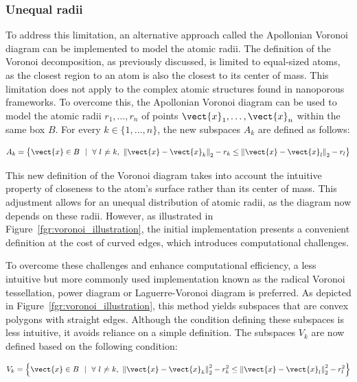\documentclass[main]{subfiles}
\begin{document}
\subsubsection{Unequal radii}

To address this limitation, an alternative approach called the Apollonian Voronoi diagram can be implemented to model the atomic radii. The definition of the Voronoi decomposition, as previously discussed, is limited to equal-sized atoms, as the closest region to an atom is also the closest to its center of mass. This limitation does not apply to the complex atomic structures found in nanoporous frameworks. To overcome this, the Apollonian Voronoi diagram\autocite{voronoi_apollonian} can be used to model the atomic radii $r_1,\ldots,r_n$ of points $\vect{x}_1,\ldots,\vect{x}_n$ within the same box $B$. For every $k\in\{1,\ldots,n\}$, the new subspaces $A_{k}$ are defined as follows:

\begin{equation}\label{eq:r_voronoi_apollonian}
  A_{k} = \left\{\vect{x} \in B\ \ |\ \ \forall\ l\neq k,\ {\lVert \vect{x}-\vect{x}_k \rVert}_2 - r_k \leq {\lVert \vect{x}-\vect{x}_l \rVert}_2 - r_l \right\}
\end{equation}

This new definition of the Voronoi diagram takes into account the intuitive property of closeness to the atom's surface rather than its center of mass. This adjustment allows for an unequal distribution of atomic radii, as the diagram now depends on these radii. However, as illustrated in Figure~\ref{fgr:voronoi_illustration}, the initial implementation presents a convenient definition at the cost of curved edges, which introduces computational challenges.

To overcome these challenges and enhance computational efficiency, a less intuitive but more commonly used implementation known as the radical Voronoi tessellation, power diagram or Laguerre-Voronoi diagram\autocite{aurenhammer_1987} is preferred. As depicted in Figure~\ref{fgr:voronoi_illustration}, this method yields subspaces that are convex polygons with straight edges. Although the condition defining these subspaces is less intuitive, it avoids reliance on a simple definition. The subspaces $V_k$ are now defined based on the following condition:

\begin{equation}\label{eq:r_voronoi_radical}
    V_{k} = \left\{\vect{x} \in B\ \ |\ \ \forall\ l\neq k,\ {\lVert \vect{x}-\vect{x}_k \rVert}_2^2 - r_k^2 \leq {\lVert \vect{x}-\vect{x}_l \rVert}_2^2 - r_l^2 \right\}
  \end{equation}
\end{document}
